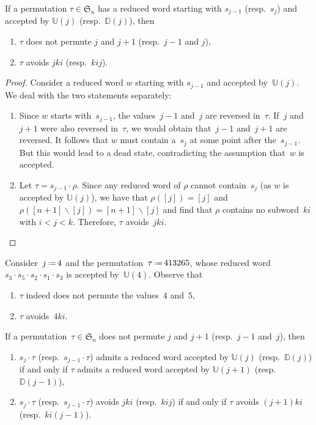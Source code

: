 \documentclass[ALCO]{cedram}
\newcommand{\fS}{\mathfrak{S}}
\newcommand{\ssm}{\smallsetminus}
\newcommand{\eqdef}{\mbox{\,\raisebox{0.2ex}{\scriptsize\ensuremath{\mathrm:}}\ensuremath{=}\,}}
\newcommand{\automatonU}{\mathbb{U}}
\newcommand{\automatonD}{\mathbb{D}}
\begin{document}
\begin{lemma}\label{lem:vincent3}
If a permutation $\tau \in \fS_n$ has a reduced word starting with $s_{j-1}$ (resp.~$s_j$) and accepted by $\automatonU(j)$ (resp.~$\automatonD(j)$), then
\begin{enumerate} 
	\item $\tau$ does not permute $j$ and $j+1$ (resp.~$j-1$ and $j$),
	\item $\tau$ avoids $jki$ (resp.~$kij$).
\end{enumerate}
\end{lemma}

\pagebreak
\begin{proof}
Consider a reduced word $w$ starting with $s_{j-1}$ and accepted by~$\automatonU(j)$. 
We deal with the two statements separately:
\begin{enumerate} 
	\item Since $w$ starts with~$s_{j-1}$, the values~$j-1$ and~$j$ are reversed in~$\tau$. If~$j$ and~$j+1$ were also reversed in~$\tau$, we would obtain that~$j-1$ and~$j+1$ are reversed. It follows that $w$ must contain a~$s_j$ at some point after the~$s_{j-1}$. But this would lead to a dead state, contradicting the assumption that~$w$ is accepted.
	\item Let $\tau = s_{j-1}\cdot \rho$. Since any reduced word of $\rho$ cannot contain~$s_j$ (as $w$ is accepted by $\automatonU(j)$), we have that $\rho([j]) = [j]$ and $\rho([n+1] \ssm [j]) = [n+1] \ssm [j]$ and find that $\rho$ contains no subword~$ki$ with $i < j < k$. Therefore, $\tau$ avoids~$jki$.
	\qedhere
\end{enumerate}
\end{proof}

\begin{example}\label{exm:lemVincent3}
Consider~$j \eqdef 4$ and the permutation~$\tau \eqdef 413265$, whose reduced word~$s_3 \cdot s_5 \cdot s_2 \cdot s_1 \cdot s_3$ is accepted by~$\automatonU(4)$.
Observe that
\begin{enumerate}
	\item $\tau$ indeed does not permute the values~$4$ and~$5$,
	\item $\tau$ avoids~$4ki$.
\end{enumerate}
\end{example}

\begin{lemma}\label{lem:vincent4}
If a permutation~$\tau \in \fS_n$ does not permute $j$ and $j+1$ (resp.~$j-1$ and~$j$), then
\begin{enumerate} 
	\item $s_j \cdot \tau$ (resp.~$s_{j-1} \cdot \tau$) admits a reduced word accepted by $\automatonU(j)$ (resp.~$\automatonD(j)$) if and only if $\tau$ admits a reduced word accepted by $\automatonU(j+1)$ (resp.~$\automatonD(j-1)$),
	\item $s_j \cdot \tau$ (resp.~$s_{j-1} \cdot \tau$) avoids $jki$ (resp.~$kij$) if and only if $\tau$ avoids $(j+1)ki$ (resp.~$ki(j-1)$).
\end{enumerate}
\end{lemma}
\end{document}
